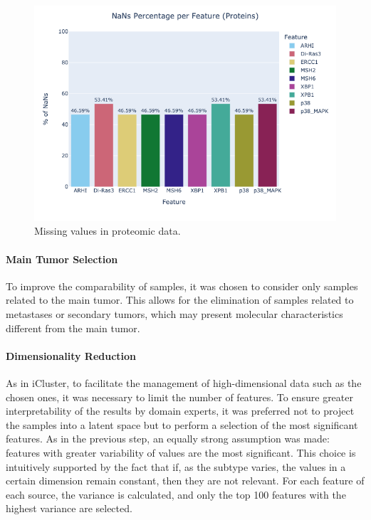 \documentclass[12pt,a4paper]{article}
\begin{document}
\begin{figure}[htbp!]
\begin{center}
\includegraphics[width=0.9\columnwidth]{./static/nans-percentage-per-feature-proteins.png}
\end{center}
\caption{Missing values in proteomic data.}
\label{fig:nans-percentage-per-feature-proteins}
\end{figure}

\pagebreak
\paragraph{Main Tumor Selection} \hfill \break
To improve the comparability of samples, it was chosen to consider only samples related to the main tumor. This allows for the elimination of samples related to metastases or secondary tumors, which may present molecular characteristics different from the main tumor.

\paragraph{Dimensionality Reduction} \hfill \break
As in iCluster, to facilitate the management of high-dimensional data such as the chosen ones, it was necessary to limit the number of features.
To ensure greater interpretability of the results by domain experts, it was preferred not to project the samples into a latent space but to perform a selection of the most significant features.
As in the previous step, an equally strong assumption was made: features with greater variability of values are the most significant.
This choice is intuitively supported by the fact that if, as the subtype varies, the values in a certain dimension remain constant, then they are not relevant.
For each feature of each source, the variance is calculated, and only the top 100 features with the highest variance are selected.
\end{document}
